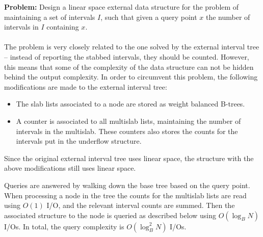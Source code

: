 \documentclass[a4paper,12pt]{article}
\begin{document}
\textbf{Problem:} Design a linear space external data structure for the problem of maintaining a set of intervals $I$, such that given a query point $x$ the number of intervals in $I$ containing $x$.
\\
\\The problem is very closely related to the one solved by the external interval tree -- instead of reporting the stabbed intervals, they should be counted. However, this means that some of the complexity of the data structure can not be hidden behind the output complexity. In order to circumvent this problem, the following modifications are made to the external interval tree:
\begin{itemize}
  \item The slab lists associated to a node are stored as weight balanced B-trees.
  \item A counter is associated to all multislab lists, maintaining the number of intervals in the multislab. These counters also stores the counts for the intervals put in the underflow structure.

\end{itemize}
Since the original external interval tree uses linear space, the structure with the above modifications still uses linear space.

Queries are answered by walking down the base tree based on the query point. When processing a node in the tree the counts for the multislab lists are read using $O(1)$ I/O, and the relevant interval counts are summed. Then the associated structure to the node is queried as described below using $O(\log_B N)$ I/Os. In total, the query complexity is $O(\log_B^2 N)$ I/Os.
\end{document}
